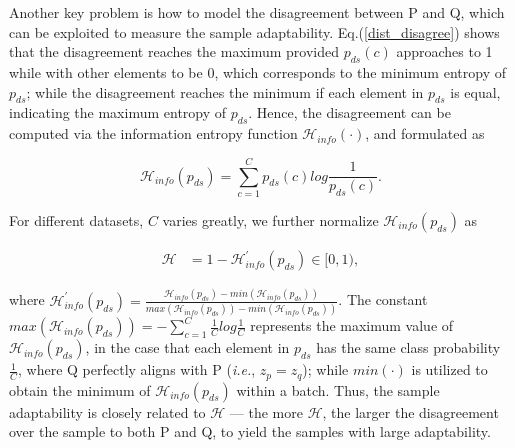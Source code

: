 Another key problem is how to model the disagreement between P and Q, which can be exploited to measure the sample adaptability. Eq.(\ref{dist_disagree}) shows that the disagreement reaches the maximum provided $p_{ds}(c)$ approaches to 1 while with other elements to be 0, which corresponds to the minimum entropy of $p_{ds}$; while the disagreement reaches the minimum if each element in $p_{ds}$ is equal, indicating the maximum entropy of $p_{ds}$. Hence, the disagreement can be computed via the information entropy function $\mathcal{H}_{info}(\cdot)$, and formulated as
\begin{small}
\begin{equation}
\mathcal{H}_{info}(p_{ds})=\sum^{C}_{c=1} p_{ds}(c)log\frac{1}{p_{ds}(c)}.
\label{metric}
\end{equation}
\end{small}
For different datasets, $C$ varies greatly, we further normalize $\mathcal{H}_{info}(p_{ds})$ as
\begin{small}
\begin{equation}
\begin{aligned}
\mathcal{H}&=1-\mathcal{H}^{'}_{info}(p_{ds}) \in [0,1),
\end{aligned}
\label{measure_r}
\end{equation}
\end{small}
where $\mathcal{H}^{'}_{info}(p_{ds})=\frac{\mathcal{H}_{info}(p_{ds})-min(\mathcal{H}_{info}(p_{ds}))}{max(\mathcal{H}_{info}(p_{ds}))-min(\mathcal{H}_{info}(p_{ds}))}$. The constant $max(\mathcal{H}_{info}(p_{ds}))=-\sum^{C}_{c=1}\frac{1}{C}log\frac{1}{C}$ represents the maximum value of $\mathcal{H}_{info}(p_{ds})$, in the case that each element in $p_{ds}$ has the same class probability $\frac{1}{C}$, where Q perfectly aligns with P (\emph{i.e.}, $z_p=z_q$); while $min(\cdot)$ is utilized to obtain the minimum of $\mathcal{H}_{info}(p_{ds})$ within a batch. Thus, the sample adaptability is closely related to $\mathcal{H}$ --- the more $\mathcal{H}$, the larger the disagreement over the sample to both P and Q, to yield the samples with large adaptability.

